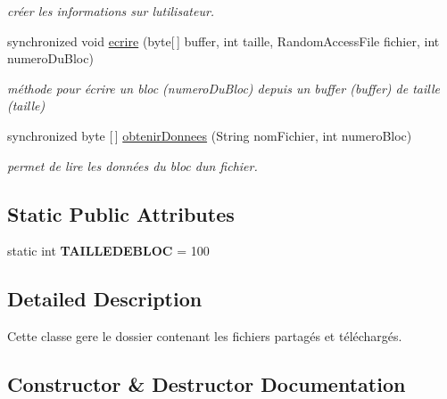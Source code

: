 \begin{DoxyCompactItemize}
\begin{DoxyCompactList}\small\item\em créer les informations sur l\textquotesingle{}utilisateur. \end{DoxyCompactList}\item 
synchronized void \hyperlink{classterminalClient_1_1GestionnaireFichier_aa88603d9d3f6f2ef654de1e58ad6457e}{ecrire} (byte\mbox{[}$\,$\mbox{]} buffer, int taille, Random\+Access\+File fichier, int numero\+Du\+Bloc)
\begin{DoxyCompactList}\small\item\em méthode pour écrire un bloc (numero\+Du\+Bloc) depuis un buffer (buffer) de taille (taille) \end{DoxyCompactList}\item 
synchronized byte \mbox{[}$\,$\mbox{]} \hyperlink{classterminalClient_1_1GestionnaireFichier_a4ec6a1fc51400312212c68f914402cb6}{obtenir\+Donnees} (String nom\+Fichier, int numero\+Bloc)
\begin{DoxyCompactList}\small\item\em permet de lire les données du bloc d\textquotesingle{}un fichier. \end{DoxyCompactList}\end{DoxyCompactItemize}
\subsection*{Static Public Attributes}
\begin{DoxyCompactItemize}
\item 
\mbox{\label{classterminalClient_1_1GestionnaireFichier_ad693be33fdd31fe37d8f99d1356f6e76}} 
static int {\bfseries T\+A\+I\+L\+L\+E\+D\+E\+B\+L\+OC} = 100
\end{DoxyCompactItemize}


\subsection{Detailed Description}
Cette classe gere le dossier contenant les fichiers partagés et téléchargés. 

\subsection{Constructor \& Destructor Documentation}
\mbox{\label{classterminalClient_1_1GestionnaireFichier_a058b107e8ee834b30e0a86f238afc852}} 
